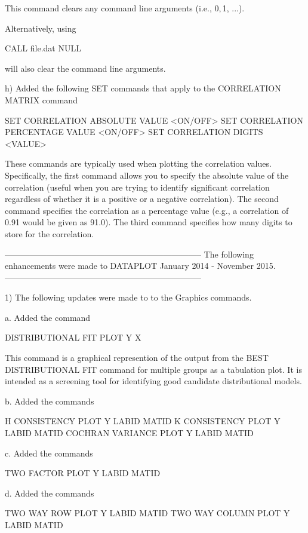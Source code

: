      This command clears any command line arguments (i.e., $0, $1, ...).

     Alternatively, using

         CALL file.dat  NULL

     will also clear the command line arguments.

  h) Added the following SET commands that apply to the CORRELATION MATRIX
     command

         SET CORRELATION ABSOLUTE VALUE <ON/OFF>
         SET CORRELATION PERCENTAGE VALUE <ON/OFF>
         SET CORRELATION DIGITS <VALUE>

     These commands are typically used when plotting the correlation values.
     Specifically, the first command allows you to specify the absolute
     value of the correlation (useful when you are trying to identify
     significant correlation regardless of whether it is a positive or a
     negative correlation).  The second command specifies the correlation
     as a percentage value (e.g., a correlation of 0.91 would be given as
     91.0).  The third command specifies how many digits to store for the
     correlation.

-----------------------------------------------------------------------
The following enhancements were made to DATAPLOT
January 2014 - November 2015.
-----------------------------------------------------------------------

 1) The following updates were made to to the Graphics commands.

    a. Added the command

         DISTRIBUTIONAL FIT PLOT Y X

       This command is a graphical represention of the output from the
       BEST DISTRIBUTIONAL FIT command for multiple groups as a tabulation
       plot.  It is intended as a screening tool for identifying good
       candidate distributional models.

    b. Added the commands

        H CONSISTENCY PLOT    Y LABID MATID
        K CONSISTENCY PLOT    Y LABID MATID
        COCHRAN VARIANCE PLOT Y LABID MATID

    c. Added the commands

        TWO FACTOR PLOT    Y LABID MATID

    d. Added the commands

        TWO WAY ROW PLOT     Y LABID MATID
        TWO WAY COLUMN PLOT  Y LABID MATID

